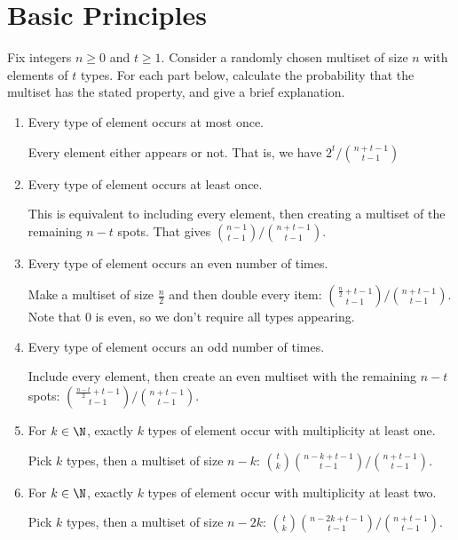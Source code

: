 \section{Basic Principles}

\begin{xca}
  Fix integers $n \geq 0$ and $t \geq 1$.
  Consider a randomly chosen multiset of size $n$ with elements of $t$ types.
  For each part below, calculate the probability that the multiset has the stated property,
  and give a brief explanation.
\end{xca}
\begin{enumerate}
  \item Every type of element occurs at most once.
        \begin{sol}
          Every element either appears or not.
          That is, we have $2^t/\binom{n+t-1}{t-1}$
        \end{sol}
  \item Every type of element occurs at least once.
        \begin{sol}
          This is equivalent to including every element,
          then creating a multiset of the remaining $n-t$ spots.
          That gives $\binom{n-1}{t-1}/\binom{n+t-1}{t-1}$.
        \end{sol}
  \item Every type of element occurs an even number of times.
        \begin{sol}
          Make a multiset of size $\frac{n}{2}$ and then double every item:
          $\binom{\frac{n}{2}+t-1}{t-1}/\binom{n+t-1}{t-1}$.
          Note that 0 is even, so we don't require all types appearing.
        \end{sol}
  \item Every type of element occurs an odd number of times.
        \begin{sol}
          Include every element, then create an even multiset
          with the remaining $n-t$ spots:
          $\binom{\frac{n-t}{2}+t-1}{t-1}/\binom{n+t-1}{t-1}$.
        \end{sol}
  \item For $k \in \N$, exactly $k$ types of element occur
        with multiplicity at least one.
        \begin{sol}
          Pick $k$ types, then a multiset of size $n-k$:
          $\binom{t}{k}\binom{n-k+t-1}{t-1}/\binom{n+t-1}{t-1}$.
        \end{sol}
  \item For $k \in \N$, exactly $k$ types of element occur
        with multiplicity at least two.
        \begin{sol}
          Pick $k$ types, then a multiset of size $n-2k$:
          $\binom{t}{k}\binom{n-2k+t-1}{t-1}/\binom{n+t-1}{t-1}$.
        \end{sol}
\end{enumerate}

